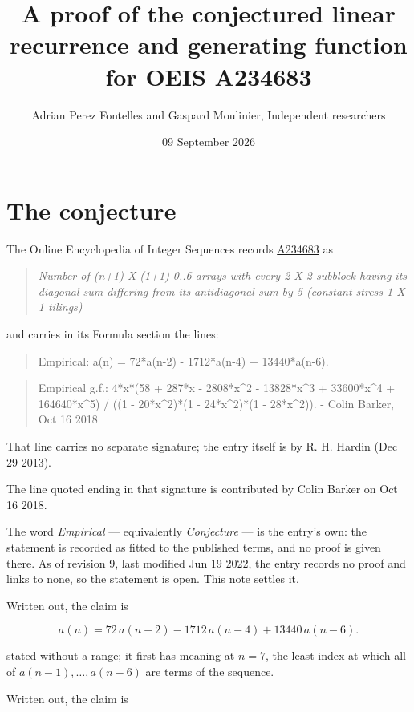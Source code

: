\documentclass[11pt]{article}
\title{A proof of the conjectured linear recurrence and generating function for OEIS A234683}
\author{Adrian Perez Fontelles and Gaspard Moulinier, Independent researchers}
\date{09 September 2026}
\theoremstyle{definition}
\begin{document}
\maketitle
\section{The conjecture}

The Online Encyclopedia of Integer Sequences records \href{https://oeis.org/A234683}{A234683} as

\begin{quote}\itshape Number of (n+1) X (1+1) 0..6 arrays with every 2 X 2 subblock having its diagonal sum differing from its antidiagonal sum by 5 (constant-stress 1 X 1 tilings)\end{quote}

and carries in its Formula section the lines:

\begin{quote}\ttfamily Empirical: a(n) = 72*a(n-2) - 1712*a(n-4) + 13440*a(n-6).\end{quote}

\begin{quote}\ttfamily Empirical g.f.: 4*x*(58 + 287*x - 2808*x\textasciicircum{}2 - 13828*x\textasciicircum{}3 + 33600*x\textasciicircum{}4 + 164640*x\textasciicircum{}5) / ((1 - 20*x\textasciicircum{}2)*(1 - 24*x\textasciicircum{}2)*(1 - 28*x\textasciicircum{}2)). - Colin Barker, Oct 16 2018\end{quote}

That line carries no separate signature; the entry itself is by R. H. Hardin (Dec 29 2013).

The line quoted ending in that signature is contributed by Colin Barker on Oct 16 2018.

The word {\itshape Empirical} --- equivalently {\itshape Conjecture} --- is the entry's own: the statement is recorded as fitted to the published terms, and no proof is given there. As of revision 9, last modified Jun 19 2022, the entry records no proof and links to none, so the statement is open. This note settles it.

Written out, the claim is

\[a(n) = 72\,a(n-2) - 1712\,a(n-4) + 13440\,a(n-6).\]

stated without a range; it first has meaning at $n = 7$, the least index at which all of $a(n-1),\dots,a(n-6)$ are terms of the sequence.

Written out, the claim is
\end{document}
